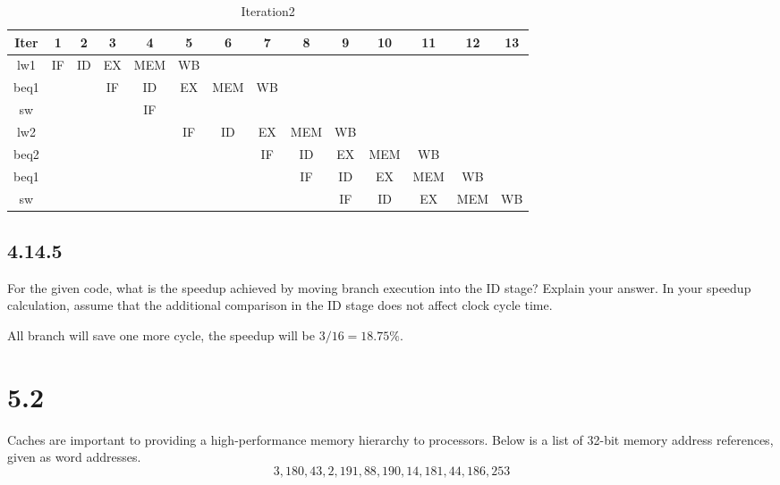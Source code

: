 \documentclass[paper=a4, fontsize=11pt]{scrartcl} %
\begin{document}
\begin{table}[H]
    \caption{Iteration2}\label{tab:iteration2}
    \begin{center}
        \scriptsize
        \begin{tabular}{cccccccccccccc}
        \toprule
        \textbf{Iter} & \textbf{1} & \textbf{2} & \textbf{3} & \textbf{4} & \textbf{5}
        & \textbf{6} & \textbf{7} & \textbf{8} & \textbf{9} & \textbf{10} & \textbf{11}
        & \textbf{12} & \textbf{13} \\
        \midrule
        lw1  & IF & ID & EX & MEM & WB \\ %
        beq1 &    &    & IF & ID & EX & MEM & WB \\ %
        sw   &    &    &    & IF \\
        lw2  &    &    &    &    & IF & ID & EX & MEM & WB \\ %
        beq2 &    &    &    &    &    &    & IF & ID & EX & MEM & WB \\ %
        beq1 &    &    &    &    &    &    &    & IF & ID & EX & MEM & WB \\ %
        sw   &    &    &    &    &    &    &    &    & IF & ID & EX & MEM & WB \\
        \bottomrule
        \end{tabular}
    \end{center}
\end{table}


\subsection{4.14.5}
\begin{fancyquotes}
    For the given code, what is the speedup achieved by moving branch execution into the ID stage? Explain your answer. In your speedup calculation, assume that the additional comparison in the ID stage does not affect clock cycle time.
\end{fancyquotes}

All branch will save one more cycle, the speedup will be $3/16=18.75\%$.

\pagebreak

\section{5.2}
\begin{fancyquotes}
    Caches are important to providing a high-performance memory hierarchy to processors. Below is a list of 32-bit memory address references, given as word addresses.
    $$3, 180, 43, 2, 191, 88, 190, 14, 181, 44, 186, 253$$
\end{fancyquotes}
\end{document}
